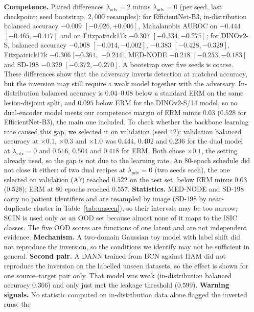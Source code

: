 \documentclass{midl}
\newcommand{\lam}{\lambda_{\mathrm{adv}}}
\begin{document}
\textbf{Competence.} Paired differences $\lam=2$ minus $\lam=0$ (per seed, last checkpoint; seed bootstrap,
$2{,}000$ resamples): for EfficientNet-B3, in-distribution balanced accuracy $-0.009$ $[-0.026, +0.006]$,
Mahalanobis AUROC on \texttt{} $-0.444$ $[-0.465, -0.417]$ and on Fitzpatrick17k $-0.307$
$[-0.334, -0.275]$; for DINOv2-S, balanced accuracy $-0.008$ $[-0.014, -0.002]$, \texttt{}
$-0.383$ $[-0.428, -0.329]$, Fitzpatrick17k $-0.306$ $[-0.361,$ $-0.244]$, MED-NODE $-0.218$
$[-0.253, -0.183]$ and SD-198 $-0.329$ $[-0.372, -0.270]$. A bootstrap over five seeds is coarse. These
differences show that the adversary inverts detection at matched accuracy, but the inversion may still
require a weak model together with the adversary.
In-distribution balanced accuracy is $0.04$--$0.08$
below a standard ERM on the same lesion-disjoint split, and $0.095$ below ERM for the DINOv2-S/14 model, so no dual-encoder model meets our competence margin of ERM minus
$0.03$ ($0.528$ for EfficientNet-B3), the main one included.
To check whether the backbone learning rate caused this gap, we selected it on validation (seed $42$):
validation balanced accuracy at $\times0.1$, $\times0.3$ and $\times1.0$ was $0.444$, $0.402$ and $0.236$
for the dual model at $\lam=0$ and $0.516$, $0.504$ and $0.418$ for ERM. Both chose $\times0.1$, the setting
already used, so the gap is not due to the learning rate. An 80-epoch schedule did not close it either: of two
dual recipes at $\lam=0$ (two seeds each), the one selected on validation (A7) reached $0.522$ on the test set,
below ERM minus $0.03$ ($0.528$); ERM at 80 epochs reached $0.557$. \textbf{Statistics.} MED-NODE and
SD-198 carry no patient identifiers and are resampled by image (SD-198 by near-duplicate cluster in
Table~\ref{tab:unseen}), so their intervals may be too narrow; SCIN is used only as an OOD set because almost none of it maps to the ISIC classes.
The five OOD scores are functions of one latent and are not independent evidence.
\textbf{Mechanism.} A two-domain Gaussian toy model with label shift did not reproduce the
inversion, so the conditions we identify may not be sufficient in general.
\textbf{Second pair.} A DANN trained from BCN against HAM did not reproduce the inversion on
the labelled unseen datasets, so the effect is shown for one source--target pair only. That model was weak
(in-distribution balanced accuracy $0.366$) and only just met the leakage threshold ($0.599$). \textbf{Warning
signals.} No statistic computed on in-distribution data alone flagged the inverted runs; the
\end{document}
